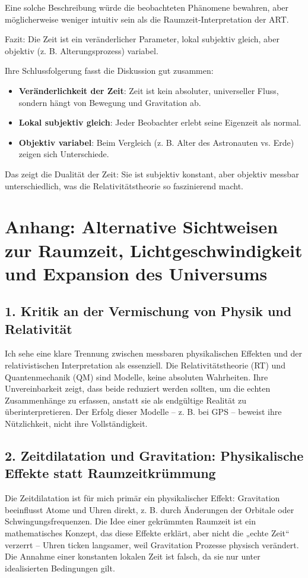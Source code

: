 \documentclass[a4paper,12pt]{article}
\begin{document}
Eine solche Beschreibung würde die beobachteten Phänomene bewahren, aber möglicherweise weniger intuitiv sein als die Raumzeit-Interpretation der ART.

Fazit: Die Zeit ist ein veränderlicher Parameter, lokal subjektiv gleich, aber objektiv (z. B. Alterungsprozess) variabel.

Ihre Schlussfolgerung fasst die Diskussion gut zusammen:
\begin{itemize}
	\item \textbf{Veränderlichkeit der Zeit}: Zeit ist kein absoluter, universeller Fluss, sondern hängt von Bewegung und Gravitation ab.
	\item \textbf{Lokal subjektiv gleich}: Jeder Beobachter erlebt seine Eigenzeit als normal.
	\item \textbf{Objektiv variabel}: Beim Vergleich (z. B. Alter des Astronauten vs. Erde) zeigen sich Unterschiede.
\end{itemize}

Das zeigt die Dualität der Zeit: Sie ist subjektiv konstant, aber objektiv messbar unterschiedlich, was die Relativitätstheorie so faszinierend macht.

	\section{Anhang: Alternative Sichtweisen zur Raumzeit, Lichtgeschwindigkeit und Expansion des Universums}
	
	\subsection{1. Kritik an der Vermischung von Physik und Relativität}
	Ich sehe eine klare Trennung zwischen messbaren physikalischen Effekten und der relativistischen Interpretation als essenziell. Die Relativitätstheorie (RT) und Quantenmechanik (QM) sind Modelle, keine absoluten Wahrheiten. Ihre Unvereinbarkeit zeigt, dass beide reduziert werden sollten, um die echten Zusammenhänge zu erfassen, anstatt sie als endgültige Realität zu überinterpretieren. Der Erfolg dieser Modelle – z. B. bei GPS – beweist ihre Nützlichkeit, nicht ihre Vollständigkeit.
	
	\subsection{2. Zeitdilatation und Gravitation: Physikalische Effekte statt Raumzeitkrümmung}
	Die Zeitdilatation ist für mich primär ein physikalischer Effekt: Gravitation beeinflusst Atome und Uhren direkt, z. B. durch Änderungen der Orbitale oder Schwingungsfrequenzen. Die Idee einer gekrümmten Raumzeit ist ein mathematisches Konzept, das diese Effekte erklärt, aber nicht die „echte Zeit“ verzerrt – Uhren ticken langsamer, weil Gravitation Prozesse physisch verändert. Die Annahme einer konstanten lokalen Zeit ist falsch, da sie nur unter idealisierten Bedingungen gilt.
	
\end{document}
